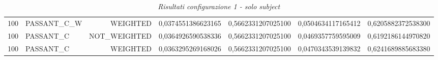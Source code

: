 \begin{table}[H]
{\begin{tabular}{ c l r c c c c }
				100 & PASSANT\_C\_W &   WEIGHTED & 0,0374551386623165 & 0,5662331207025100 & 0,0504634117165412 & 0,6205882372538300 \\
				
				100 &  PASSANT\_C & NOT\_WEIGHTED & 0,0364926590538336 & 0,5662331207025100 & 0,0469357759595009 & 0,6192186144970820 \\
				
				100 &  PASSANT\_C &   WEIGHTED & 0,0363295269168026 & 0,5662331207025100 & 0,0470343539139832 & 0,6241689885683380 \\
			\bottomrule
		\end{tabular}
}
\caption{\emph{Risultati configurazione 1 - solo subject}}
\end{table}

\setlength{\tabcolsep}{12pt}
